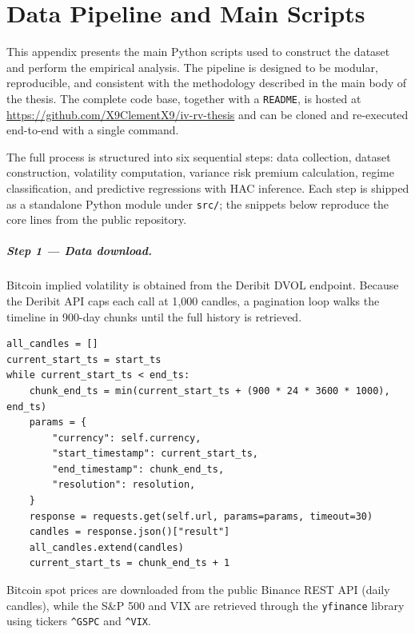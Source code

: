 \documentclass[11pt,a4paper,openany]{report}
\begin{document}
\appendix
\chapter{Data Pipeline and Main Scripts}\label{appendix}\label{data-pipeline-and-main-scripts}

This appendix presents the main Python scripts used to construct the
dataset and perform the empirical analysis. The pipeline is designed to
be modular, reproducible, and consistent with the methodology described
in the main body of the thesis. The complete code base, together with a
\texttt{README}, is hosted at
\url{https://github.com/X9ClementX9/iv-rv-thesis} and can be cloned
and re-executed end-to-end with a single command.

The full process is structured into six sequential steps: data
collection, dataset construction, volatility computation, variance risk
premium calculation, regime classification, and predictive regressions
with HAC inference. Each step is shipped as a standalone Python module
under \texttt{src/}; the snippets below reproduce the core lines from
the public repository.

\paragraph{Step 1 --- Data download.} Bitcoin implied volatility is
obtained from the Deribit DVOL endpoint. Because the Deribit API caps
each call at 1{,}000 candles, a pagination loop walks the timeline in
900-day chunks until the full history is retrieved.

\begin{lstlisting}[caption={DVOL paginated download (\texttt{src/downloaders/btc\_options\_deribit.py})}]
all_candles = []
current_start_ts = start_ts
while current_start_ts < end_ts:
    chunk_end_ts = min(current_start_ts + (900 * 24 * 3600 * 1000), end_ts)
    params = {
        "currency": self.currency,
        "start_timestamp": current_start_ts,
        "end_timestamp": chunk_end_ts,
        "resolution": resolution,
    }
    response = requests.get(self.url, params=params, timeout=30)
    candles = response.json()["result"]
    all_candles.extend(candles)
    current_start_ts = chunk_end_ts + 1
\end{lstlisting}

Bitcoin spot prices are downloaded from the public Binance REST API
(daily candles), while the S\&P 500 and VIX are retrieved through the
\texttt{yfinance} library using tickers \texttt{\^{}GSPC} and
\texttt{\^{}VIX}.
\end{document}
